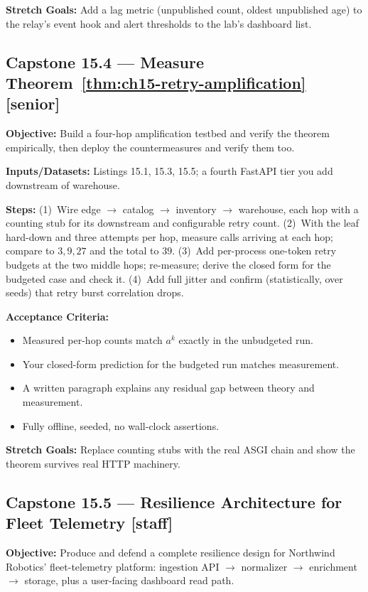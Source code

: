 \textbf{Stretch Goals:} Add a lag metric (unpublished count, oldest
unpublished age) to the relay's event hook and alert thresholds to the
lab's dashboard list.

\subsection*{Capstone 15.4 --- Measure Theorem~\ref{thm:ch15-retry-amplification} \hfill [senior]}
\textbf{Objective:} Build a four-hop amplification testbed and verify the
theorem empirically, then deploy the countermeasures and verify them too.

\textbf{Inputs/Datasets:} Listings 15.1, 15.3, 15.5; a fourth FastAPI tier
you add downstream of warehouse.

\textbf{Steps:} (1)~Wire edge $\to$ catalog $\to$ inventory $\to$
warehouse, each hop with a counting stub for its downstream and
configurable retry count. (2)~With the leaf hard-down and three attempts
per hop, measure calls arriving at each hop; compare to $3, 9, 27$ and the
total to $39$. (3)~Add per-process one-token retry budgets at the two
middle hops; re-measure; derive the closed form for the budgeted case and
check it. (4)~Add full jitter and confirm (statistically, over seeds) that
retry burst correlation drops.

\textbf{Acceptance Criteria:}
\begin{itemize}
  \item[$\square$] Measured per-hop counts match $a^k$ exactly in the
        unbudgeted run.
  \item[$\square$] Your closed-form prediction for the budgeted run matches
        measurement.
  \item[$\square$] A written paragraph explains any residual gap between
        theory and measurement.
  \item[$\square$] Fully offline, seeded, no wall-clock assertions.
\end{itemize}

\textbf{Stretch Goals:} Replace counting stubs with the real ASGI chain and
show the theorem survives real HTTP machinery.

\subsection*{Capstone 15.5 --- Resilience Architecture for Fleet Telemetry \hfill [staff]}
\textbf{Objective:} Produce and defend a complete resilience design for
Northwind Robotics' fleet-telemetry platform: ingestion API $\to$
normalizer $\to$ enrichment $\to$ storage, plus a user-facing dashboard
read path.

